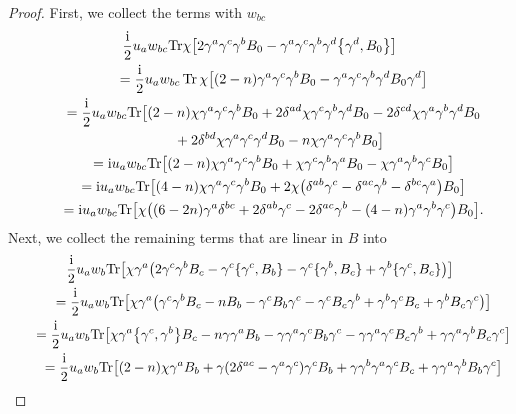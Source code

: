 \documentclass[10pt,a4paper]{amsart}
\numberwithin{equation}{section}
\theoremstyle{definition}
\def\Tr{\mathrm{Tr}}
\begin{document}
\begin{proof}
	First, we collect the terms with $w_{bc}$
		\begin{gather*}
			\frac{\rm i}{2}u_aw_{bc}\Tr \chi \bigl[2\gamma^a\gamma^c\gamma^bB_0-\gamma^a\gamma^c\gamma^b\gamma^d\bigl\{\gamma^d,B_0\bigr\}\bigr]\\
			\qquad=\frac{\rm i}{2}u_aw_{bc}\operatorname{Tr} \chi \bigl[(2-n)\gamma^a\gamma^c\gamma^bB_0-\gamma^a\gamma^c\gamma^b\gamma^dB_0\gamma^d\bigr]
			\\
			\qquad=\frac{\rm i}{2}u_aw_{bc}\Tr \bigl[(2-n)\chi \gamma^a\gamma^c\gamma^bB_0
			+ 2\delta^{ad}\chi \gamma^c\gamma^b\gamma^dB_0
			- 2\delta^{cd}\chi \gamma^a\gamma^b\gamma^dB_0\\
		\phantom{\qquad=}{}	+ 2\delta^{bd}\chi \gamma^a\gamma^c\gamma^dB_0
			-n \chi \gamma^a\gamma^c\gamma^bB_0\bigr]
			\\
			\qquad= {\rm i} u_a w_{bc}\Tr \bigl[(2-n) \chi \gamma^a \gamma^c\gamma^b B_0 +\chi \gamma^c \gamma^b \gamma^a B_0-\chi \gamma^a \gamma^b \gamma^c B_0\bigr]\\
			\qquad= {\rm i}u_a w_{bc} \Tr\bigl[(4-n) \chi\gamma^a \gamma^c \gamma^b B_0 +2\chi\bigl(\delta^{ab}\gamma^c -\delta^{ac} \gamma^b -\delta^{bc}\gamma^a\bigr)B_0\bigr]\\
			\qquad= {\rm i}u_a w_{bc}\Tr\bigl[\chi\bigl((6-2n)\gamma^a \delta^{bc}+2\delta^{ab}\gamma^c -2\delta^{ac}\gamma^b-(4-n)\gamma^a\gamma^b \gamma^c \bigr)B_0\bigr].
		\end{gather*}
	Next, we collect the remaining terms that are linear in $B$ into
		\begin{gather*}
			\frac{\rm i}{2}u_a w_{b} \Tr \bigl[
			\chi\gamma^a \bigl(2\gamma^c \gamma^b B_c -\gamma^c\{\gamma^c, B_b\}-\gamma^c \{\gamma^b, B_c\}+\gamma^b \{\gamma^c,B_c\}\bigr) \bigr] \\
			\qquad=\frac{\rm i}{2} u_a w_b \Tr \bigl[
			\chi\gamma^a \bigl(\gamma^c \gamma^b B_c -n B_b -\gamma^c B_b \gamma^c -\gamma^c B_c \gamma^b +\gamma^b \gamma^c B_c +\gamma^b B_c \gamma^c\bigr)
			\bigr] \\
			\qquad=\frac{\rm i}{2}u_a w_b \Tr \bigl[
			\chi\gamma^a \bigl\{\gamma^c,\gamma^b\bigr\} B_c -n\gamma\gamma^a B_b -\gamma\gamma^a \gamma^c B_b \gamma^c -\gamma \gamma^a \gamma^c B_c \gamma^b +\gamma\gamma^a\gamma^b B_c \gamma^c
			\bigr] \\
			\qquad=\frac{\rm i}{2} u_a w_{b}\Tr \bigl[(2-n) \chi\gamma^a B_b +\gamma (2\delta^{ac} -\gamma^a\gamma^c)\gamma^c B_b +\gamma\gamma^b\gamma^a \gamma^c B_c +\gamma\gamma^a\gamma^b B_b \gamma^c\bigr] \\

\end{gather*}
\end{proof}
\end{document}

